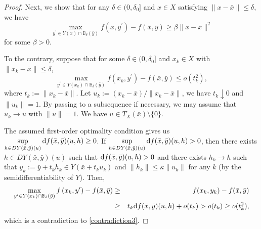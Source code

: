 \documentclass[11pt]{article}
\numberwithin{equation}{section}
\begin{document}
{\begin{proof}
Next, we show that for any $\delta \in (0,\delta_0]$ and $x \in X$ satisfying $\|x-\bar x\| \leq \delta$, we have
\begin{equation}\label{second-order-growth3} \max _{y^{\prime}  \in  Y(x)\cap \mathbb{B}_\delta(\bar y)} f\left(x, y^{\prime}\right) - f(\bar x,\bar y) \geq \beta \|x-\bar x\|^2\end{equation}
for some $\beta > 0$.


To the contrary, suppose that for some $\delta \in (0,\delta_0]$ and $x_k \in X$  with $\|x_k-\bar x\| \leq \delta$,
\begin{equation}\label{contradiction3}
	\max _{y^{\prime}  \in  Y(x_k)\cap \mathbb{B}_\delta(\bar y)} f\left(x_k, y^{\prime}\right)-f(\bar x,\bar y) \leq o(t_k^2),
\end{equation}
where $t_k:= \|x_k-\bar x\|$. Let $u_k:=(x_k-\bar x)/\|x_k-\bar x\|$, we have $t_k\downarrow 0$ and $\|u_k\|=1$. By passing to a subsequence if necessary, we may assume that $u_k \to u$ with $\|u\|=1$. We have $u \in T_{X}(\bar x) \setminus \{0\}$.

The assumed first-order optimality condition gives us $\sup\limits_{h \in D Y(\bar x,\bar y)(u)} {\rm d} f(\bar x,\bar y)(u,h) \geq 0$.
If $\sup\limits_{h \in D Y(\bar x,\bar y)(u)} {\rm d} f(\bar x,\bar y)(u,h) >0$,
then there exists $h \in D Y(\bar x,\bar y)(u)$ such that ${\rm d} f(\bar x,\bar y)(u,h) >0$ and there exists $h_k \to h$ such that $y_k:=\bar y+t_kh_k \in Y(\bar x+t_ku_k)$ and $\|h_k\| \leq \kappa \|u_k\|$ for any $k$ (by the semidifferentiability of $Y$). Then,
\begin{eqnarray*}\max _{y^{\prime}  \in  Y(x_k)\cap \mathbb{B}_{\delta}(\bar y)} f\left(x_k, y^{\prime}\right)-f(\bar x,\bar y) & \geq & f(x_k,y_k)-f(\bar x,\bar y)\\
&  \geq & t_k {\rm d} f(\bar x,\bar y)(u,h) +o(t_k) > o(t_k) \geq o(t_k^2),\end{eqnarray*}
which is a contradiction to \eqref{contradiction3}.


\end{proof}}
\end{document}
